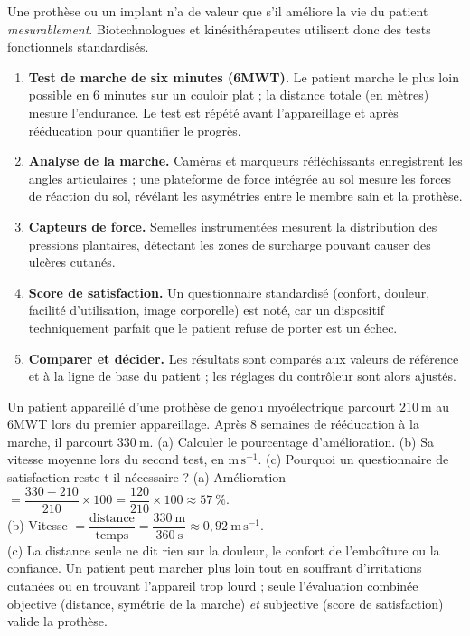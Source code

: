 \documentclass[11pt]{article}
\begin{document}
Une prothèse ou un implant n'a de valeur que s'il améliore la vie du patient \emph{mesurablement}. Biotechnologues et kinésithérapeutes utilisent donc des tests fonctionnels standardisés.

\begin{methode}
\begin{enumerate}
\item \textbf{Test de marche de six minutes (6MWT).} Le patient marche le plus loin possible en 6 minutes sur un couloir plat ; la distance totale (en mètres) mesure l'endurance. Le test est répété avant l'appareillage et après rééducation pour quantifier le progrès.
\item \textbf{Analyse de la marche.} Caméras et marqueurs réfléchissants enregistrent les angles articulaires ; une plateforme de force intégrée au sol mesure les forces de réaction du sol, révélant les asymétries entre le membre sain et la prothèse.
\item \textbf{Capteurs de force.} Semelles instrumentées mesurent la distribution des pressions plantaires, détectant les zones de surcharge pouvant causer des ulcères cutanés.
\item \textbf{Score de satisfaction.} Un questionnaire standardisé (confort, douleur, facilité d'utilisation, image corporelle) est noté, car un dispositif techniquement parfait que le patient refuse de porter est un échec.
\item \textbf{Comparer et décider.} Les résultats sont comparés aux valeurs de référence et à la ligne de base du patient ; les réglages du contrôleur sont alors ajustés.
\end{enumerate}
\end{methode}

\begin{exoresolu}
Un patient appareillé d'une prothèse de genou myoélectrique parcourt $210\ \mathrm{m}$ au 6MWT lors du premier appareillage. Après 8 semaines de rééducation à la marche, il parcourt $330\ \mathrm{m}$. (a) Calculer le pourcentage d'amélioration. (b) Sa vitesse moyenne lors du second test, en $\mathrm{m\,s^{-1}}$. (c) Pourquoi un questionnaire de satisfaction reste-t-il nécessaire ?
\tcblower
(a) Amélioration $= \dfrac{330-210}{210}\times 100 = \dfrac{120}{210}\times 100 \approx 57\ \%$.\\
(b) Vitesse $= \dfrac{\text{distance}}{\text{temps}} = \dfrac{330\ \mathrm{m}}{360\ \mathrm{s}} \approx 0,92\ \mathrm{m\,s^{-1}}$.\\
(c) La distance seule ne dit rien sur la douleur, le confort de l'emboîture ou la confiance. Un patient peut marcher plus loin tout en souffrant d'irritations cutanées ou en trouvant l'appareil trop lourd ; seule l'évaluation combinée objective (distance, symétrie de la marche) \emph{et} subjective (score de satisfaction) valide la prothèse.
\end{exoresolu}
\end{document}
